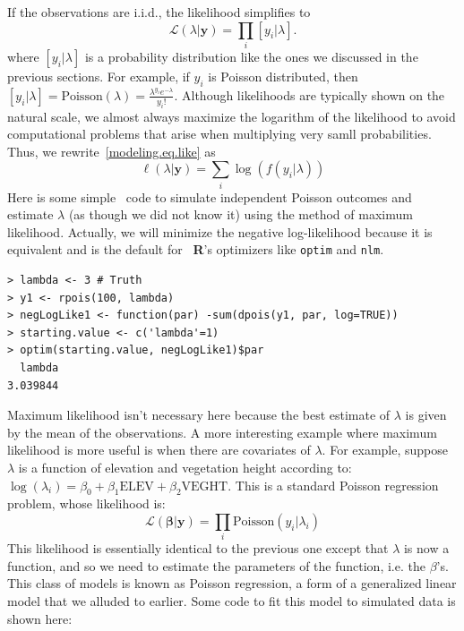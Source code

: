 If the observations are i.i.d., the likelihood simplifies to
\begin{equation}
  \mathcal{L}(\lambda | \mathbf{y}) = \prod_i [y_i | \lambda].
  \label{modeling.eq.like}
\end{equation}
where $[y_i | \lambda]$ is a probability distribution like the ones
we discussed in the previous sections. For example, if $y_i$ is
Poisson distributed, then
$[y_i | \lambda] = \text{Poisson}(\lambda) = \frac{\lambda^{y_i}e^{-\lambda}}{y_i!}$.
Although likelihoods are typically shown on the natural scale, we
almost always maximize the logarithm of the likelihood to
avoid computational problems that arise when multiplying very samll
probabilities. Thus, we rewrite~\ref{modeling.eq.like} as
\begin{equation}
  \ell(\lambda | \mathbf{y}) = \sum_i \log(f(y_i | \lambda))
  \label{modeling.eq.like}
\end{equation}
Here is some simple \R~code to simulate independent Poisson outcomes
and estimate $\lambda$ (as though we did not know it) using the
method of maximum likelihood. Actually, we will minimize the negative
log-likelihood because it is equivalent and is the default for ~{\bf R}'s
optimizers like \verb+optim+ and \verb+nlm+.
\begin{verbatim}
> lambda <- 3 # Truth
> y1 <- rpois(100, lambda)
> negLogLike1 <- function(par) -sum(dpois(y1, par, log=TRUE))
> starting.value <- c('lambda'=1)
> optim(starting.value, negLogLike1)$par
  lambda
3.039844
\end{verbatim}
Maximum likelihood isn't necessary here because the best estimate of
$\lambda$ is given by the mean of the observations. A more interesting
example where maximum likelihood is more useful is when there are
covariates of $\lambda$. For example, suppose $\lambda$ is a function
of elevation and vegetation height according to: $\log(\lambda_i) =
\beta_0 + \beta_1\text{ELEV} + \beta_2\text{VEGHT}$. This is a
standard Poisson regression problem, whose likelihood is:
\begin{equation}
  \mathcal{L}(\bm{\beta} | \mathbf{y}) = \prod_i \text{Poisson}(y_i | \lambda_i)
  \label{modeling.eq.like}
\end{equation}
This likelihood is essentially identical to the previous one except
that $\lambda$ is now a function, and so we need to estimate the
parameters of the function, i.e. the $\beta$'s. This class of models is
known as Poisson regression, a form of a generalized linear model that
we alluded to earlier. Some
code to fit this model to simulated data is shown here:
